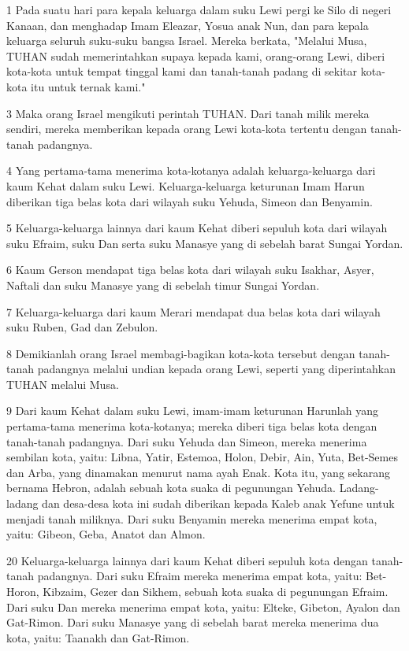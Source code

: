 \par 1 Pada suatu hari para kepala keluarga dalam suku Lewi pergi ke Silo di negeri Kanaan, dan menghadap Imam Eleazar, Yosua anak Nun, dan para kepala keluarga seluruh suku-suku bangsa Israel. Mereka berkata, "Melalui Musa, TUHAN sudah memerintahkan supaya kepada kami, orang-orang Lewi, diberi kota-kota untuk tempat tinggal kami dan tanah-tanah padang di sekitar kota-kota itu untuk ternak kami."
\par 3 Maka orang Israel mengikuti perintah TUHAN. Dari tanah milik mereka sendiri, mereka memberikan kepada orang Lewi kota-kota tertentu dengan tanah-tanah padangnya.
\par 4 Yang pertama-tama menerima kota-kotanya adalah keluarga-keluarga dari kaum Kehat dalam suku Lewi. Keluarga-keluarga keturunan Imam Harun diberikan tiga belas kota dari wilayah suku Yehuda, Simeon dan Benyamin.
\par 5 Keluarga-keluarga lainnya dari kaum Kehat diberi sepuluh kota dari wilayah suku Efraim, suku Dan serta suku Manasye yang di sebelah barat Sungai Yordan.
\par 6 Kaum Gerson mendapat tiga belas kota dari wilayah suku Isakhar, Asyer, Naftali dan suku Manasye yang di sebelah timur Sungai Yordan.
\par 7 Keluarga-keluarga dari kaum Merari mendapat dua belas kota dari wilayah suku Ruben, Gad dan Zebulon.
\par 8 Demikianlah orang Israel membagi-bagikan kota-kota tersebut dengan tanah-tanah padangnya melalui undian kepada orang Lewi, seperti yang diperintahkan TUHAN melalui Musa.
\par 9 Dari kaum Kehat dalam suku Lewi, imam-imam keturunan Harunlah yang pertama-tama menerima kota-kotanya; mereka diberi tiga belas kota dengan tanah-tanah padangnya. Dari suku Yehuda dan Simeon, mereka menerima sembilan kota, yaitu: Libna, Yatir, Estemoa, Holon, Debir, Ain, Yuta, Bet-Semes dan Arba, yang dinamakan menurut nama ayah Enak. Kota itu, yang sekarang bernama Hebron, adalah sebuah kota suaka di pegunungan Yehuda. Ladang-ladang dan desa-desa kota ini sudah diberikan kepada Kaleb anak Yefune untuk menjadi tanah miliknya. Dari suku Benyamin mereka menerima empat kota, yaitu: Gibeon, Geba, Anatot dan Almon.
\par 20 Keluarga-keluarga lainnya dari kaum Kehat diberi sepuluh kota dengan tanah-tanah padangnya. Dari suku Efraim mereka menerima empat kota, yaitu: Bet-Horon, Kibzaim, Gezer dan Sikhem, sebuah kota suaka di pegunungan Efraim. Dari suku Dan mereka menerima empat kota, yaitu: Elteke, Gibeton, Ayalon dan Gat-Rimon. Dari suku Manasye yang di sebelah barat mereka menerima dua kota, yaitu: Taanakh dan Gat-Rimon.

